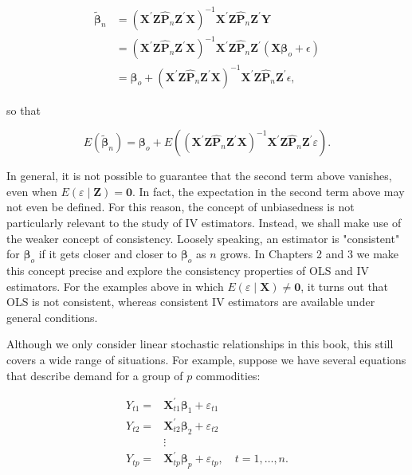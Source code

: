 \documentclass[10pt]{article}
\begin{document}
$$
\begin{aligned}
\tilde{\boldsymbol{\beta}}_{n} & =\left(\mathbf{X}^{\prime} \mathbf{Z} \hat{\mathbf{P}}_{n} \mathbf{Z}^{\prime} \mathbf{X}\right)^{-1} \mathbf{X}^{\prime} \mathbf{Z} \hat{\mathbf{P}}_{n} \mathbf{Z}^{\prime} \mathbf{Y} \\
& =\left(\mathbf{X}^{\prime} \mathbf{Z} \hat{\mathbf{P}}_{n} \mathbf{Z}^{\prime} \mathbf{X}\right)^{-1} \mathbf{X}^{\prime} \mathbf{Z} \hat{\mathbf{P}}_{n} \mathbf{Z}^{\prime}\left(\mathbf{X} \boldsymbol{\beta}_{o}+\epsilon\right) \\
& =\boldsymbol{\beta}_{o}+\left(\mathbf{X}^{\prime} \mathbf{Z} \hat{\mathbf{P}}_{n} \mathbf{Z}^{\prime} \mathbf{X}\right)^{-1} \mathbf{X}^{\prime} \mathbf{Z} \hat{\mathbf{P}}_{n} \mathbf{Z}^{\prime} \epsilon,
\end{aligned}
$$

so that

$$
E\left(\tilde{\boldsymbol{\beta}}_{n}\right)=\boldsymbol{\beta}_{o}+E\left(\left(\mathbf{X}^{\prime} \mathbf{Z} \hat{\mathbf{P}}_{n} \mathbf{Z}^{\prime} \mathbf{X}\right)^{-1} \mathbf{X}^{\prime} \mathbf{Z} \hat{\mathbf{P}}_{n} \mathbf{Z}^{\prime} \varepsilon\right) .
$$

In general, it is not possible to guarantee that the second term above vanishes, even when $E(\varepsilon \mid \mathbf{Z})=\mathbf{0}$. In fact, the expectation in the second term above may not even be defined. For this reason, the concept of unbiasedness is not particularly relevant to the study of IV estimators. Instead, we shall make use of the weaker concept of consistency. Loosely speaking, an estimator is "consistent" for $\boldsymbol{\beta}_{o}$ if it gets closer and closer to $\boldsymbol{\beta}_{o}$ as $n$ grows. In Chapters 2 and 3 we make this concept precise and explore the consistency properties of OLS and IV estimators. For the examples above in which $E(\varepsilon \mid \mathbf{X}) \neq \mathbf{0}$, it turns out that OLS is not consistent, whereas consistent IV estimators are available under general conditions.

Although we only consider linear stochastic relationships in this book, this still covers a wide range of situations. For example, suppose we have several equations that describe demand for a group of $p$ commodities:

$$
\begin{aligned}
Y_{t 1}= & \mathbf{X}_{t 1}^{\prime} \boldsymbol{\beta}_{1}+\varepsilon_{t 1} \\
Y_{t 2}= & \mathbf{X}_{t 2}^{\prime} \boldsymbol{\beta}_{2}+\varepsilon_{t 2} \\
& \vdots \\
Y_{t p}= & \mathbf{X}_{t p}^{\prime} \boldsymbol{\beta}_{p}+\varepsilon_{t p}, \quad t=1, \ldots, n .
\end{aligned}
$$
\end{document}
